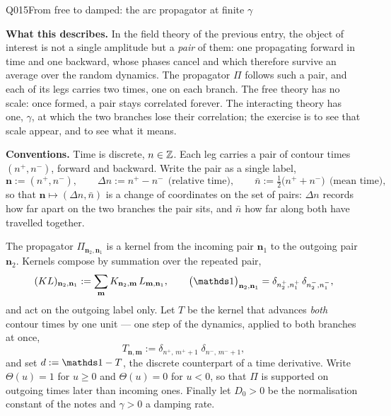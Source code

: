 \begin{entry}{Q015}{From free to damped: the arc propagator at finite $\gamma$}


\begin{problem}
\textbf{What this describes.} In the field theory of the previous entry, the object of
interest is not a single amplitude but a \emph{pair} of them: one propagating forward in
time and one backward, whose phases cancel and which therefore survive an average over
the random dynamics. The propagator $\Pi$ follows such a pair, and each of its legs
carries two times, one on each branch. The free theory has no scale: once formed, a pair
stays correlated forever. The interacting theory has one, $\gamma$, at which the two
branches lose their correlation; the exercise is to see that scale appear, and to see
what it means.

\textbf{Conventions.} Time is discrete, $n\in\mathbb{Z}$. Each leg carries a pair of contour
times $(n^{+},n^{-})$, forward and backward. Write the pair as a single label,
\[
  \mathbf n:=(n^{+},n^{-}),
  \qquad
  \Delta n:=n^{+}-n^{-}\ \ \text{(relative time)},
  \qquad
  \bar n:=\tfrac12\bigl(n^{+}+n^{-}\bigr)\ \ \text{(mean time)} ,
\]
so that $\mathbf n\mapsto(\Delta n,\bar n)$ is a change of coordinates on the set of
pairs: $\Delta n$ records how far apart on the two branches the pair sits, and $\bar n$
how far along both have travelled together.

The propagator $\Pi_{\mathbf n_2,\mathbf n_1}$ is a kernel from the incoming pair
$\mathbf n_1$ to the outgoing pair $\mathbf n_2$. Kernels compose by summation over the
repeated pair,
\[
  (KL)_{\mathbf n_2,\mathbf n_1}
  :=\sum_{\mathbf m}K_{\mathbf n_2,\mathbf m}\,L_{\mathbf m,\mathbf n_1},
  \qquad
  \bigl(\id\bigr)_{\mathbf n_2,\mathbf n_1}
  =\delta_{n_2^{+},n_1^{+}}\,\delta_{n_2^{-},n_1^{-}} ,
\]
and act on the outgoing label only. Let $T$ be the kernel that advances \emph{both}
contour times by one unit --- one step of the dynamics, applied to both branches at
once,
\[
  T_{\mathbf n,\mathbf m}
  :=\delta_{n^{+},\,m^{+}+1}\;\delta_{n^{-},\,m^{-}+1},
\]
and set $d:=\id-T$, the discrete counterpart of a time derivative. Write $\Theta(u)=1$
for $u\ge0$ and $\Theta(u)=0$ for $u<0$, so that $\Pi$ is supported on outgoing times
later than incoming ones. Finally let $D_0>0$ be the normalisation constant of the notes
and $\gamma>0$ a damping rate.


\end{problem}
\end{entry}
